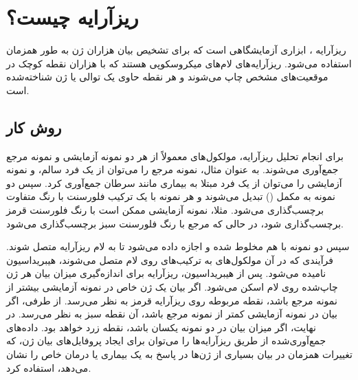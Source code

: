 \documentclass{article}
\begin{document}
\section{ریزآرایه چیست؟}
ریزآرایه ، ابزاری آزمایشگاهی است که برای تشخیص بیان هزاران ژن به طور همزمان استفاده می‌شود. ریزآرایه‌های  لام‌های میکروسکوپی هستند که با هزاران نقطه کوچک در موقعیت‌های مشخص چاپ می‌شوند و هر نقطه حاوی یک توالی  یا ژن شناخته‌شده است.

 \subsection*{روش کار}
برای انجام تحلیل ریزآرایه، مولکول‌های  معمولاً از هر دو نمونه آزمایشی و نمونه مرجع جمع‌آوری می‌شوند. به عنوان مثال، نمونه مرجع را می‌توان از یک فرد سالم، و نمونه آزمایشی را می‌توان از یک فرد مبتلا به بیماری مانند سرطان جمع‌آوری کرد. سپس دو نمونه  به  مکمل () تبدیل می‌شوند و هر نمونه با یک ترکیب فلورسنت  با رنگ متفاوت برچسب‌گذاری می‌شود. مثلا، نمونه آزمایشی  ممکن است با رنگ فلورسنت قرمز برچسب‌گذاری شود، در حالی که  مرجع با رنگ فلورسنت سبز برچسب‌گذاری می‌شود.

 سپس دو نمونه با هم مخلوط شده و اجازه داده می‌شود تا به لام ریزآرایه متصل شوند. فرآیندی که در آن مولکول‌های  به ترکیب‌های  روی لام متصل می‌شوند، هیبریداسیون  نامیده می‌شود.
پس از هیبریداسیون، ریزآرایه برای اندازه‌گیری میزان بیان هر ژن چاپ‌شده روی لام اسکن می‌شود. اگر بیان یک ژن خاص در نمونه آزمایشی بیشتر از نمونه مرجع باشد، نقطه مربوطه روی ریزآرایه قرمز به نظر می‌رسد.
از طرفی، اگر بیان در نمونه آزمایشی کمتر از نمونه مرجع باشد، آن نقطه سبز به نظر می‌رسد. در نهایت، اگر میزان بیان در دو نمونه یکسان باشد، نقطه زرد خواهد بود. داده‌های جمع‌آوری‌شده از طریق ریزآرایه‌ها را می‌توان برای ایجاد پروفایل‌های بیان ژن، که تغییرات همزمان در بیان بسیاری از ژن‌ها در پاسخ به یک بیماری یا درمان خاص را نشان می‌دهد، استفاده کرد. \cite{nature-microarray}
 
\end{document}

